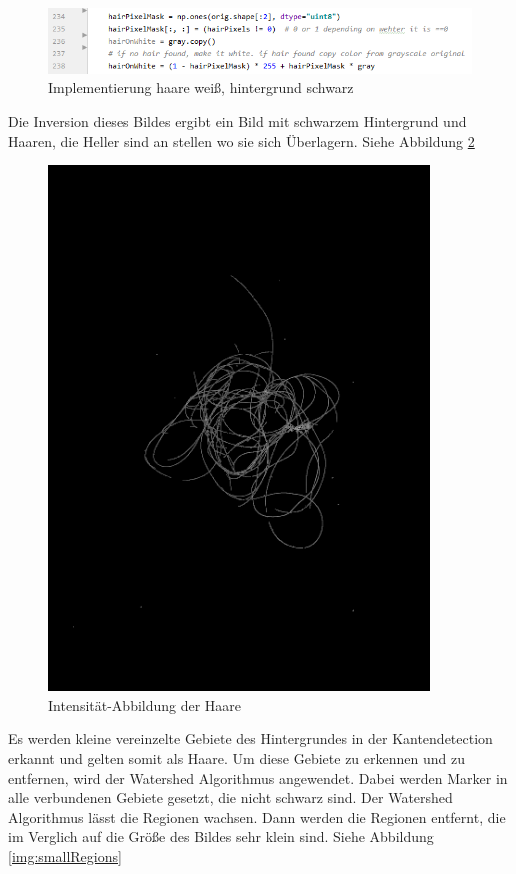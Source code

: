 \documentclass[german,a4paper,12pt]{llncs}
\begin{document}
\begin{figure}
	\centering
	\includegraphics[width=1.1\textwidth]{01quellc.PNG}
	\caption[]{Implementierung haare weiß, hintergrund schwarz}
	\label{q:haironwhite}
\end{figure}

Die Inversion dieses Bildes ergibt ein Bild mit schwarzem Hintergrund und Haaren, die Heller sind an stellen wo sie sich Überlagern. Siehe Abbildung \ref{img:Intensity}
\begin{figure}
	\centering
	\includegraphics[width=0.9\textwidth]{fig64/05intenstiy.png}
	\caption[]{Intensität-Abbildung der Haare}
	\label{img:Intensity}
\end{figure}

Es werden kleine vereinzelte Gebiete des Hintergrundes in der Kantendetection erkannt und gelten somit als Haare.
Um diese Gebiete zu erkennen und zu entfernen, wird der Watershed Algorithmus angewendet.   
Dabei werden Marker in alle verbundenen Gebiete gesetzt, die nicht schwarz sind. Der Watershed Algorithmus lässt die Regionen wachsen. 
Dann werden die Regionen entfernt, die im Verglich auf die Größe des Bildes sehr klein sind. Siehe Abbildung \ref{img:smallRegions}
\end{document}
